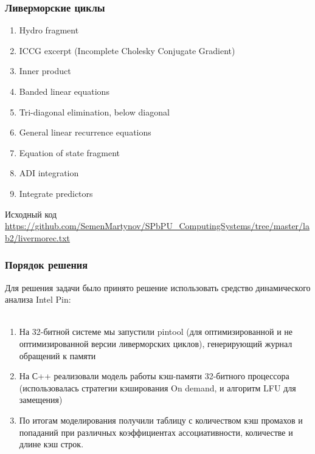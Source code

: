 \documentclass{beamer}
\begin{document}

\begin{frame}
\frametitle{Ливерморские циклы}
\begin{enumerate}
\item Hydro fragment
\item ICCG excerpt (Incomplete Cholesky Conjugate Gradient)
\item Inner product
\item Banded linear equations
\item Tri-diagonal elimination, below diagonal
\item General linear recurrence equations
\item Equation of state fragment
\item ADI integration
\item Integrate predictors
\end{enumerate}
Исходный код \url{https://github.com/SemenMartynov/SPbPU_ComputingSystems/tree/master/lab2/livermorec.txt}
\end{frame}


\begin{frame}
\frametitle{Порядок решения}

Для решения задачи было принято решение использовать средство динамического анализа Intel Pin:\\~\\

\begin{enumerate}
\item На 32-битной системе мы запустили pintool (для оптимизированной и не оптимизированной версии ливерморских циклов), генерирующий журнал обращений к памяти
\item На С++ реализовали модель работы кэш-памяти 32-битного процессора (использовалась стратегии кэширования On demand, и алгоритм LFU для замещения)
\item По итогам моделирования получили таблицу с количеством кэш промахов и попаданий при различных коэффициентах ассоциативности, количестве и длине кэш строк.
\end{enumerate}

\end{frame}

\end{document}

